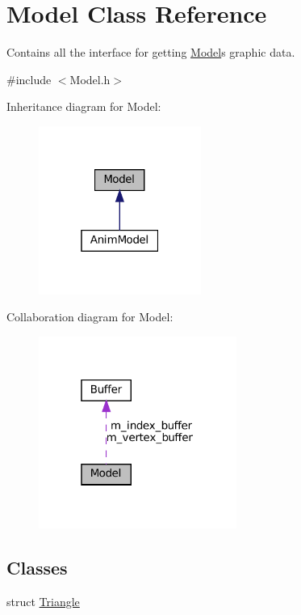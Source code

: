 \hypertarget{classModel}{}\section{Model Class Reference}
\label{classModel}


Contains all the interface for getting \hyperlink{classModel}{Model}\textquotesingle{}s graphic data.  




{\ttfamily \#include $<$Model.\+h$>$}



Inheritance diagram for Model\+:
\nopagebreak
\begin{figure}[H]
\begin{center}
\leavevmode
\includegraphics[width=151pt]{classModel__inherit__graph}
\end{center}
\end{figure}


Collaboration diagram for Model\+:
\nopagebreak
\begin{figure}[H]
\begin{center}
\leavevmode
\includegraphics[width=184pt]{classModel__coll__graph}
\end{center}
\end{figure}
\subsection*{Classes}
\begin{DoxyCompactItemize}
\item 
struct \hyperlink{structModel_1_1Triangle}{Triangle}
\end{DoxyCompactItemize}
